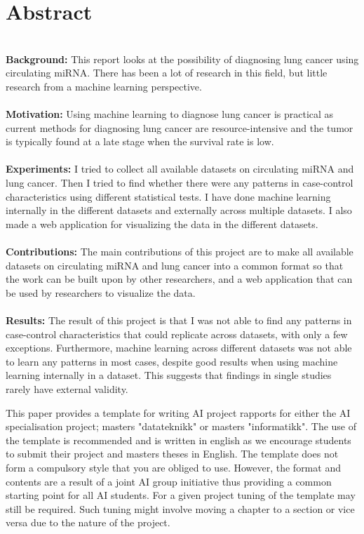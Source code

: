 \section*{Abstract}
\hfill\\
\textbf{Background:} This report looks at the possibility of diagnosing lung cancer using circulating miRNA. There has been a lot of research in this field, but little research from a machine learning perspective.
\\\\
\textbf{Motivation:} Using machine learning to diagnose lung cancer is practical as current methods for diagnosing lung cancer are resource-intensive and the tumor is typically found at a late stage when the survival rate is low.
\\\\
\textbf{Experiments:} I tried to collect all available datasets on circulating miRNA and lung cancer. Then I tried to find whether there were any patterns in case-control characteristics using different statistical tests. I have done machine learning internally in the different datasets and externally across multiple datasets. I also made a web application for visualizing the data in the different datasets.
\\\\
\textbf{Contributions:} The main contributions of this project are to make all available datasets on circulating miRNA and lung cancer into a common format so that the work can be built upon by other researchers, and a web application that can be used by researchers to visualize the data.
\\\\
\textbf{Results:} The result of this project is that I was not able to find any patterns in case-control characteristics that could replicate across datasets, with only a few exceptions. Furthermore, machine learning across different datasets was not able to learn any patterns in most cases, despite good results when using machine learning internally in a dataset. This suggests that findings in single studies rarely have external validity.

\iffalse

This paper provides a template for writing AI project rapports for either the AI specialisation project; masters "datateknikk" or masters "informatikk". The use of the template is recommended and is written in english as we encourage students to submit their project and masters theses in English. 
The template does not form a compulsory style that you are obliged to use. However, the format and contents are a result of a joint AI group initiative thus providing a common starting point for all AI students. For a given project tuning of the template may still be required. Such tuning might involve moving a chapter to a section or vice versa due to the nature of the project. 

